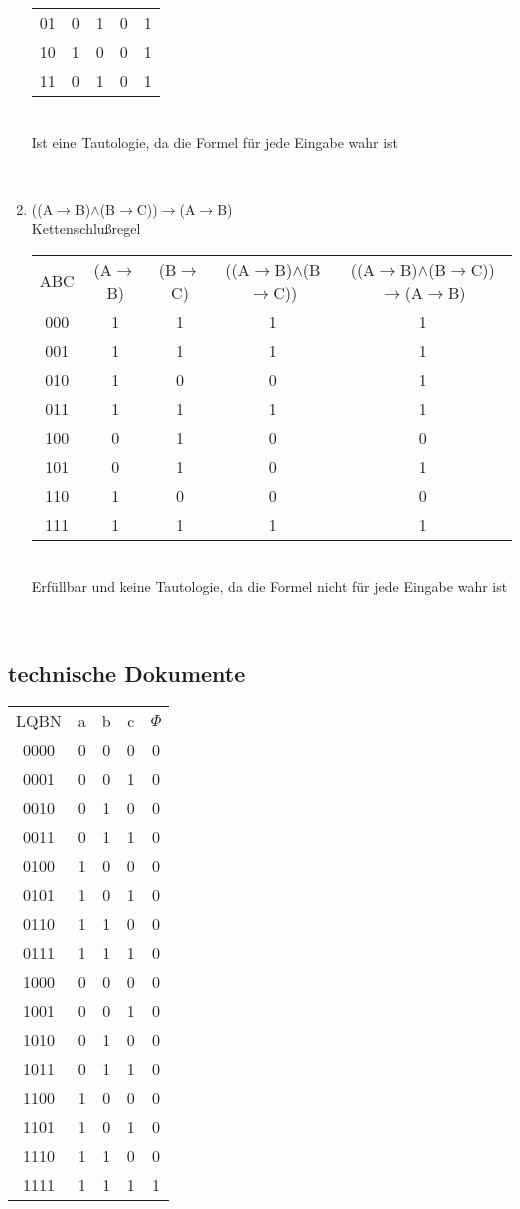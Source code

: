 \begin{enumerate}
{\begin{tabular}{ccccc}
        01 & 0 & 1 & 0 & 1\\
        10 & 1 & 0 & 0 & 1\\
        11 & 0 & 1 & 0 & 1\\
    \end{tabular}
    \\Ist eine Tautologie, da die Formel für jede Eingabe wahr ist}\\
    \item ((A$\to$B)$\wedge$(B$\to$C))$\to$(A$\to$B) \\ Kettenschlußregel\\
    {\tiny
    \begin{tabular}{ccccc}
        ABC & (A$\to$B) & (B$\to$C) & ((A$\to$B)$\wedge$(B$\to$C)) &
        ((A$\to$B)$\wedge$(B$\to$C))$\to$(A$\to$B)\\
        000 & 1 & 1 & 1 & 1\\
        001 & 1 & 1 & 1 & 1\\
        010 & 1 & 0 & 0 & 1\\
        011 & 1 & 1 & 1 & 1\\
        100 & 0 & 1 & 0 & 0\\
        101 & 0 & 1 & 0 & 1\\
        110 & 1 & 0 & 0 & 0\\
        111 & 1 & 1 & 1 & 1\\
    \end{tabular}
    \\ Erfüllbar und keine Tautologie, da die Formel nicht für jede Eingabe
    wahr ist}\\
\end{enumerate}
\subsection{technische Dokumente}
{
    \tiny
    \begin{tabular}{ccccc}
        LQBN & a & b & c & $\Phi$\\
        0000 & 0 & 0 & 0 & 0 \\
        0001 & 0 & 0 & 1 & 0 \\
        0010 & 0 & 1 & 0 & 0 \\
        0011 & 0 & 1 & 1 & 0 \\
        0100 & 1 & 0 & 0 & 0 \\
        0101 & 1 & 0 & 1 & 0 \\
        0110 & 1 & 1 & 0 & 0 \\
        0111 & 1 & 1 & 1 & 0 \\
        1000 & 0 & 0 & 0 & 0 \\
        1001 & 0 & 0 & 1 & 0 \\
        1010 & 0 & 1 & 0 & 0 \\
        1011 & 0 & 1 & 1 & 0 \\
        1100 & 1 & 0 & 0 & 0 \\
        1101 & 1 & 0 & 1 & 0 \\
        1110 & 1 & 1 & 0 & 0 \\
        1111 & 1 & 1 & 1 & 1 \\
    \end{tabular}
}
